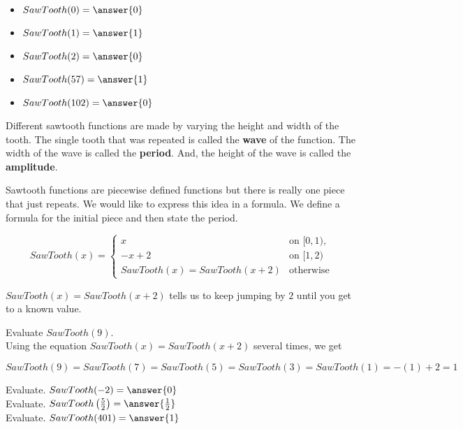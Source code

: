 \documentclass{ximera}
\begin{document}
\begin{example}
\begin{question}
  \begin{itemize}
    \item $SawTooth(0) = \answer{0}$
    \item $SawTooth(1) = \answer{1}$
    \item $SawTooth(2) = \answer{0}$
    \item $SawTooth(57) = \answer{1}$
    \item $SawTooth(102) = \answer{0}$
  \end{itemize}
\end{question}

\end{example}



Different sawtooth functions are made by varying the height and width of the tooth.  The single tooth that was repeated is called the \textbf{wave} of the function.  The width of the wave is called the \textbf{period}. And, the height of the wave is called the \textbf{amplitude}.




Sawtooth functions are piecewise defined functions but there is really one piece that just repeats.  We would like to express this idea in a formula. We define a formula for the initial piece and then state the period.




\[
SawTooth(x) = 
\begin{cases}
  x &\text{on $[0,1)$,} \\
  -x+2 &\text{on $[1,2)$} \\ 
  SawTooth(x) = SawTooth(x+2) & \text{otherwise}
\end{cases}
\]


$SawTooth(x) = SawTooth(x+2)$ tells us to keep jumping by $2$ until you get to a known value.


\begin{example}


Evaluate  $SawTooth(9)$. \\

Using the equation $SawTooth(x) = SawTooth(x+2)$ several times, we get 


\[
SawTooth(9) = SawTooth(7) = SawTooth(5) = SawTooth(3) = SawTooth(1) = -(1) + 2 = 1
\]


\begin{question}

Evaluate.  $SawTooth(-2) = \answer{0}$ \\

Evaluate.  $SawTooth\left( \frac{5}{2} \right) = \answer{\frac{1}{2}}$ \\

Evaluate.  $SawTooth(401) = \answer{1}$

\end{question}


\end{example}
\end{document}
